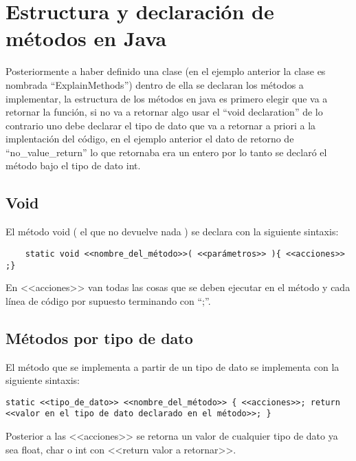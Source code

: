 \documentclass{article}
\begin{document}
\section{Estructura y declaración de métodos en Java}
Posteriormente a haber definido una clase (en el ejemplo anterior la clase es nombrada ``ExplainMethods'') dentro de ella se declaran los métodos a implementar, la estructura de los métodos en java es primero elegir que va a retornar la función,  si no va a retornar algo usar el ``void declaration'' de lo contrario uno debe declarar el tipo de dato que va a retornar a priori a la implentación del código, en el ejemplo anterior el dato de retorno de ``no\_value\_return'' lo que retornaba era un entero por lo tanto se declaró el método bajo el tipo de dato int.

\subsection{Void}
El método void ( el que no devuelve nada ) se declara con la siguiente sintaxis:
\begin{verbatim}
    static void <<nombre_del_método>>( <<parámetros>> ){ <<acciones>> ;}
\end{verbatim} 
En <<acciones>> van todas las cosas que se deben ejecutar en el método y cada línea de código por supuesto terminando con ``;''.

\subsection{Métodos por tipo de dato}
El método que se implementa a partir de un tipo de dato se implementa con la siguiente sintaxis: 
\begin{Verbatim}[breaklines=true, breakanywhere=true]
    static <<tipo_de_dato>> <<nombre_del_método>> { <<acciones>>; return <<valor en el tipo de dato declarado en el método>>; }
\end{Verbatim}  
Posterior a las <<acciones>> se retorna un valor de cualquier tipo de dato ya sea float, char o int con <<return valor a retornar>>. 

\end{document}
